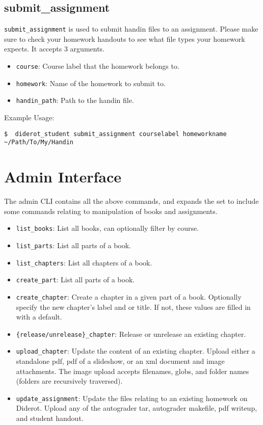 \subsection{submit\_assignment}

\verb|submit_assignment| is used to submit handin files to an assignment.
%
Please make sure to check your homework handouts to see what file types
your homework expects.
%
It accepts 3 arguments.

\begin{itemize}
  \item \verb|course|: Course label that the homework belongs to.
  \item \verb|homework|: Name of the homework to submit to.
  \item \verb|handin_path|: Path to the handin file.
\end{itemize}

Example Usage:
\begin{verbatim}
$  diderot_student submit_assignment courselabel homeworkname ~/Path/To/My/Handin
\end{verbatim}

\section{Admin Interface}

The admin CLI contains all the above commands, and expands the set to include
some commands relating to manipulation of books and assignments.

\begin{itemize}
  \item \verb|list_books|: List all books, can optionally filter by course.
  \item \verb|list_parts|: List all parts of a book.
  \item \verb|list_chapters|: List all chapters of a book.
  \item \verb|create_part|: List all parts of a book.
  \item \verb|create_chapter|: Create a chapter in a given part of a
    book. Optionally specify the new chapter's label and or title. If
    not, these values are filled in with a default.
  \item \verb|{release/unrelease}_chapter|: Release or unrelease an existing chapter.
  \item \verb|upload_chapter|: Update the content of an existing
    chapter. Upload either a standalone pdf, pdf of a slideshow, or an
    xml document and image attachments.  The image upload accepts
    filenames, globs, and folder names (folders are recursively
    traversed).
  \item \verb|update_assignment|: Update the files relating to an existing homework on Diderot.  Upload any of the autograder tar, autograder makefile, pdf writeup, and student handout.
\end{itemize}

